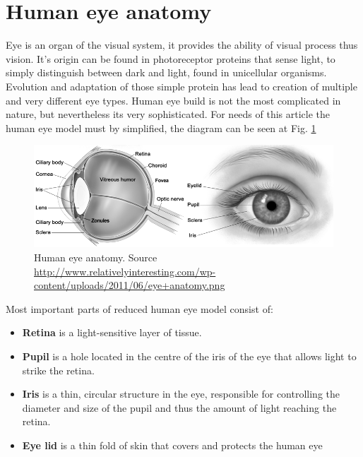\documentclass[conference]{IEEEtran}
\newcommand{\Ref}[1]{Fig. \ref{#1}}
\begin{document}
\section{Human eye anatomy}
Eye is an organ of the visual system, it provides the ability of visual process thus vision. It's origin can be found in photoreceptor proteins that sense light, to simply distinguish between dark and light, found in unicellular organisms. Evolution and adaptation of those simple protein has lead to creation of multiple and very different eye types. Human eye build is not the most complicated in nature, but nevertheless its very sophisticated. For needs of this article the human eye model must by simplified, the diagram can be seen at \Ref{fig:eye_anatomy}
\begin{figure}[!h]
	\includegraphics[scale = 0.40]{eye_anatomy.png}
	\caption{Human eye anatomy. Source \url{http://www.relativelyinteresting.com/wp-content/uploads/2011/06/eye+anatomy.png} }
	 \label{fig:eye_anatomy}
\end{figure}
Most important parts of reduced human eye model consist of:
\begin{itemize}
	\item \textbf{Retina} is a light-sensitive layer of tissue.
	\item \textbf{Pupil} is a hole located in the centre of the iris of the eye that allows light to strike the retina.
	\item \textbf{Iris} is a thin, circular structure in the eye, responsible for controlling the diameter and size of the pupil and thus the amount of light reaching the retina.
	\item  \textbf{Eye lid} is a thin fold of skin that covers and protects the human eye
\end{itemize}
\end{document}
